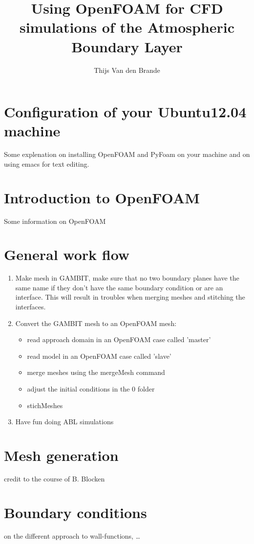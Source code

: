 \documentclass{article}
\begin{document}
\title{Using OpenFOAM for CFD simulations of the Atmospheric Boundary Layer}
\author{Thijs Van den Brande}
\maketitle

\section{Configuration of your Ubuntu12.04 machine}
Some explenation on installing OpenFOAM and PyFoam on your machine and on using
emacs for text editing.

\section{Introduction to OpenFOAM}
Some information on OpenFOAM

\section{General work flow}
\begin{enumerate}
  \item Make mesh in GAMBIT, make sure that no two boundary planes have the same
  name if they don't have the same boundary condition or are an interface. This
  will result in troubles when merging meshes and stitching the interfaces.
  \item Convert the GAMBIT mesh to an OpenFOAM mesh:
  \begin{itemize}
    \item read approach domain in an OpenFOAM case called 'master'
    \item read model in an OpenFOAM case called 'slave'
    \item merge meshes using the mergeMesh command
    \item adjust the initial conditions in the 0 folder
    \item stichMeshes
  \end{itemize}
  \item Have fun doing ABL simulations
\end{enumerate}
\section{Mesh generation}
credit to the course of B. Blocken

\section{Boundary conditions}
on the different approach to wall-functions, \ldots
\end{document}
